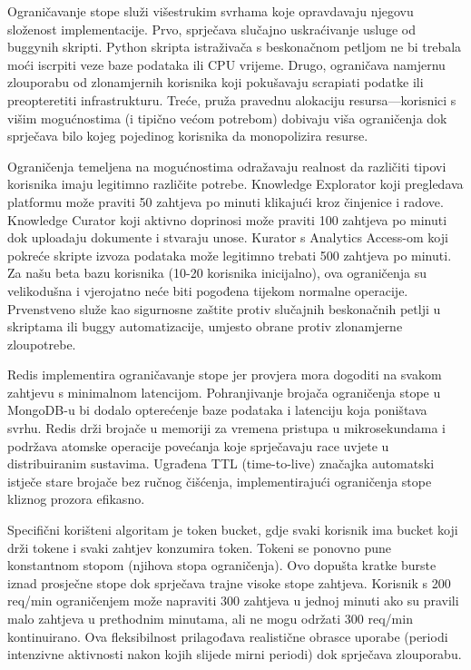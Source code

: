 \documentclass[12pt,a4paper]{article}
\begin{document}
Ograničavanje stope služi višestrukim svrhama koje opravdavaju njegovu složenost implementacije. Prvo, sprječava slučajno uskraćivanje usluge od buggynih skripti. Python skripta istraživača s beskonačnom petljom ne bi trebala moći iscrpiti veze baze podataka ili CPU vrijeme. Drugo, ograničava namjernu zlouporabu od zlonamjernih korisnika koji pokušavaju scrapiati podatke ili preopteretiti infrastrukturu. Treće, pruža pravednu alokaciju resursa—korisnici s višim mogućnostima (i tipično većom potrebom) dobivaju viša ograničenja dok sprječava bilo kojeg pojedinog korisnika da monopolizira resurse.

Ograničenja temeljena na mogućnostima odražavaju realnost da različiti tipovi korisnika imaju legitimno različite potrebe. Knowledge Explorator koji pregledava platformu može praviti 50 zahtjeva po minuti klikajući kroz činjenice i radove. Knowledge Curator koji aktivno doprinosi može praviti 100 zahtjeva po minuti dok uploadaju dokumente i stvaraju unose. Kurator s Analytics Access-om koji pokreće skripte izvoza podataka može legitimno trebati 500 zahtjeva po minuti. Za našu beta bazu korisnika (10-20 korisnika inicijalno), ova ograničenja su velikodušna i vjerojatno neće biti pogođena tijekom normalne operacije. Prvenstveno služe kao sigurnosne zaštite protiv slučajnih beskonačnih petlji u skriptama ili buggy automatizacije, umjesto obrane protiv zlonamjerne zloupotrebe.

Redis implementira ograničavanje stope jer provjera mora dogoditi na svakom zahtjevu s minimalnom latencijom. Pohranjivanje brojača ograničenja stope u MongoDB-u bi dodalo opterećenje baze podataka i latenciju koja poništava svrhu. Redis drži brojače u memoriji za vremena pristupa u mikrosekundama i podržava atomske operacije povećanja koje sprječavaju race uvjete u distribuiranim sustavima. Ugrađena TTL (time-to-live) značajka automatski istječe stare brojače bez ručnog čišćenja, implementirajući ograničenja stope kliznog prozora efikasno.

Specifični korišteni algoritam je token bucket, gdje svaki korisnik ima bucket koji drži tokene i svaki zahtjev konzumira token. Tokeni se ponovno pune konstantnom stopom (njihova stopa ograničenja). Ovo dopušta kratke burste iznad prosječne stope dok sprječava trajne visoke stope zahtjeva. Korisnik s 200 req/min ograničenjem može napraviti 300 zahtjeva u jednoj minuti ako su pravili malo zahtjeva u prethodnim minutama, ali ne mogu održati 300 req/min kontinuirano. Ova fleksibilnost prilagođava realistične obrasce uporabe (periodi intenzivne aktivnosti nakon kojih slijede mirni periodi) dok sprječava zlouporabu.
\end{document}
